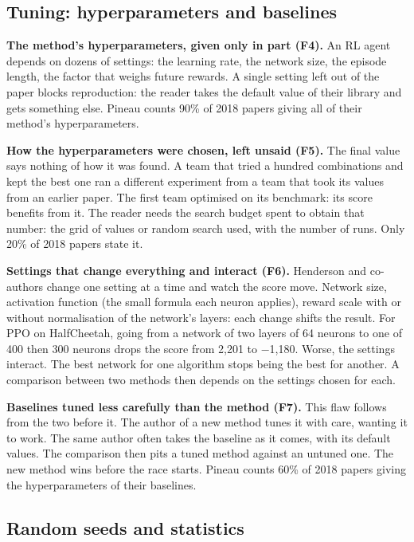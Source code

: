 \documentclass[11pt,a4paper]{article}
\begin{document}
\subsection{Tuning: hyperparameters and
baselines}\label{tuning-hyperparameters-and-baselines}

\textbf{The method's hyperparameters, given only in part (F4).} An RL
agent depends on dozens of settings: the learning rate, the network
size, the episode length, the factor that weighs future rewards. A
single setting left out of the paper blocks reproduction: the reader
takes the default value of their library and gets something else. Pineau
counts 90\% of 2018 papers giving all of their method's hyperparameters.

\textbf{How the hyperparameters were chosen, left unsaid (F5).} The
final value says nothing of how it was found. A team that tried a
hundred combinations and kept the best one ran a different experiment
from a team that took its values from an earlier paper. The first team
optimised on its benchmark: its score benefits from it. The reader needs
the search budget spent to obtain that number: the grid of values or
random search used, with the number of runs. Only 20\% of 2018 papers
state it.

\textbf{Settings that change everything and interact (F6).} Henderson
and co-authors change one setting at a time and watch the score move.
Network size, activation function (the small formula each neuron
applies), reward scale with or without normalisation of the network's
layers: each change shifts the result. For PPO on HalfCheetah, going
from a network of two layers of 64 neurons to one of 400 then 300
neurons drops the score from 2,201 to −1,180. Worse, the settings
interact. The best network for one algorithm stops being the best for
another. A comparison between two methods then depends on the settings
chosen for each.

\textbf{Baselines tuned less carefully than the method (F7).} This flaw
follows from the two before it. The author of a new method tunes it with
care, wanting it to work. The same author often takes the baseline as it
comes, with its default values. The comparison then pits a tuned method
against an untuned one. The new method wins before the race starts.
Pineau counts 60\% of 2018 papers giving the hyperparameters of their
baselines.

\subsection{Random seeds and
statistics}\label{random-seeds-and-statistics}
\end{document}
